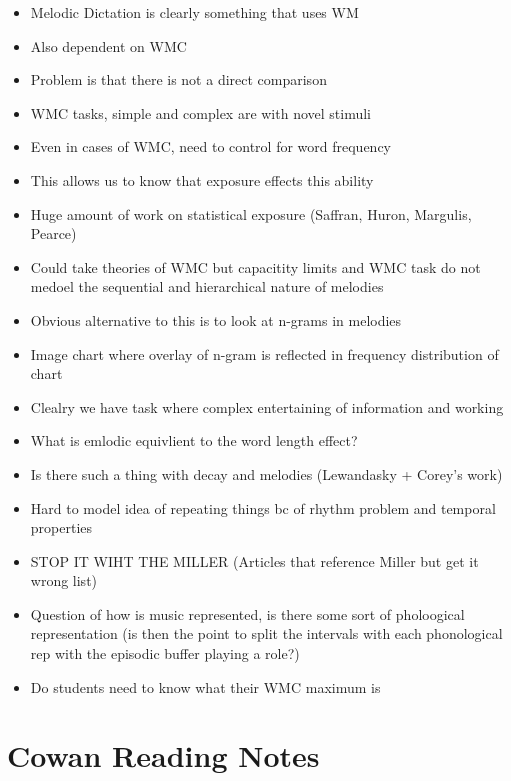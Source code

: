 \documentclass[]{book}
\theoremstyle{definition}
\theoremstyle{definition}
\theoremstyle{definition}
\theoremstyle{remark}
\begin{document}
\begin{itemize}
\item
  Melodic Dictation is clearly something that uses WM
\item
  Also dependent on WMC
\item
  Problem is that there is not a direct comparison
\item
  WMC tasks, simple and complex are with novel stimuli
\item
  Even in cases of WMC, need to control for word frequency
\item
  This allows us to know that exposure effects this ability
\item
  Huge amount of work on statistical exposure (Saffran, Huron, Margulis,
  Pearce)
\item
  Could take theories of WMC but capacitity limits and WMC task do not
  medoel the sequential and hierarchical nature of melodies
\item
  Obvious alternative to this is to look at n-grams in melodies
\item
  Image chart where overlay of n-gram is reflected in frequency
  distribution of chart
\item
  Clealry we have task where complex entertaining of information and
  working
\item
  What is emlodic equivlient to the word length effect?
\item
  Is there such a thing with decay and melodies (Lewandasky + Corey's
  work)
\item
  Hard to model idea of repeating things bc of rhythm problem and
  temporal properties
\item
  STOP IT WIHT THE MILLER (Articles that reference Miller but get it
  wrong list)
\item
  Question of how is music represented, is there some sort of
  pholoogical representation (is then the point to split the intervals
  with each phonological rep with the episodic buffer playing a role?)
\item
  Do students need to know what their WMC maximum is
\end{itemize}

\hypertarget{cowan-reading-notes}{%
\section{Cowan Reading Notes}\label{cowan-reading-notes}}
\end{document}
